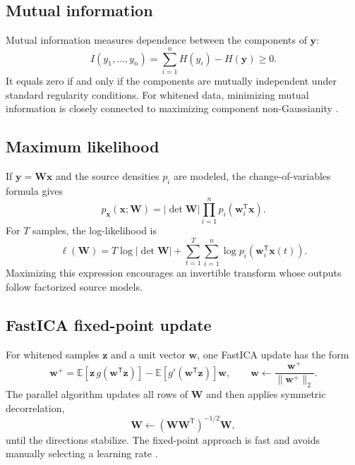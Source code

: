 \documentclass[
    paper=a4,
    fontsize=11pt,
    DIV=11,
    parskip=half,
    headings=normal,
    numbers=noendperiod,
    abstract=true,
    titlepage=true
]{scrartcl}
\begin{document}
\subsection{Mutual information}

Mutual information measures dependence between the components of $\mathbf{y}$:
\begin{equation}
    I(y_1,\ldots,y_n)
    =\sum_{i=1}^{n}H(y_i)-H(\mathbf{y})\geq0.
    \label{eq:mutual-info}
\end{equation}
It equals zero if and only if the components are mutually independent under standard regularity conditions. For whitened data, minimizing mutual information is closely connected to maximizing component non-Gaussianity \cite{comon1994}.

\subsection{Maximum likelihood}

If $\mathbf{y}=\mathbf{W}\mathbf{x}$ and the source densities $p_i$ are modeled, the change-of-variables formula gives
\begin{equation}
    p_{\mathbf{x}}(\mathbf{x};\mathbf{W})
    =|\det\mathbf{W}|\prod_{i=1}^{n}p_i(\mathbf{w}_i^{\mathsf T}\mathbf{x}).
\end{equation}
For $T$ samples, the log-likelihood is
\begin{equation}
    \ell(\mathbf{W})
    =T\log|\det\mathbf{W}|
    +\sum_{t=1}^{T}\sum_{i=1}^{n}
    \log p_i(\mathbf{w}_i^{\mathsf T}\mathbf{x}(t)).
    \label{eq:likelihood}
\end{equation}
Maximizing this expression encourages an invertible transform whose outputs follow factorized source models.

\subsection{FastICA fixed-point update}

For whitened samples $\mathbf{z}$ and a unit vector $\mathbf{w}$, one FastICA update has the form
\begin{equation}
    \mathbf{w}^{+}
    =\mathbb{E}\!\left[\mathbf{z}\,g(\mathbf{w}^{\mathsf T}\mathbf{z})\right]
    -\mathbb{E}\!\left[g'(\mathbf{w}^{\mathsf T}\mathbf{z})\right]\mathbf{w},
    \qquad
    \mathbf{w}\leftarrow\frac{\mathbf{w}^{+}}{\|\mathbf{w}^{+}\|_2}.
    \label{eq:fastica}
\end{equation}
The parallel algorithm updates all rows of $\mathbf{W}$ and then applies symmetric decorrelation,
\begin{equation}
    \mathbf{W}\leftarrow
    (\mathbf{W}\mathbf{W}^{\mathsf T})^{-1/2}\mathbf{W},
\end{equation}
until the directions stabilize. The fixed-point approach is fast and avoids manually selecting a learning rate \cite{hyvarinen1999}.
\end{document}
